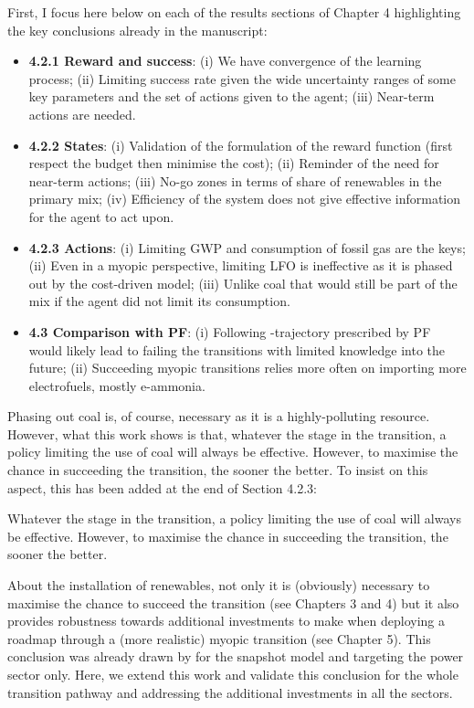 \documentclass[12pt,a4paper]{article}
\begin{document}
\noindent First, I focus here below on each of the results sections of Chapter 4 highlighting the key conclusions already in the manuscript:

\begin{itemize}
\item \textbf{4.2.1 Reward and success}: (i) We have convergence of the learning process; (ii) Limiting success rate given the wide uncertainty ranges of some key parameters and the set of actions given to the agent; (iii) Near-term actions are needed.
\item \textbf{4.2.2 States}: (i) Validation of the formulation of the reward function (first respect the  budget then minimise the cost); (ii) Reminder of the need for near-term actions; (iii) No-go zones in terms of share of renewables in the primary mix; (iv) Efficiency of the system does not give effective information for the agent to act upon.
\item \textbf{4.2.3 Actions}: (i) Limiting GWP and consumption of fossil gas are the keys; (ii) Even in a myopic perspective, limiting LFO is ineffective as it is phased out by the cost-driven model; (iii) Unlike coal that would still be part of the mix if the agent did not limit its consumption.
\item \textbf{4.3 Comparison with PF}: (i) Following -trajectory prescribed by PF would likely lead to failing the transitions with limited knowledge into the future; (ii) Succeeding myopic transitions relies more often on importing more electrofuels, mostly e-ammonia. 
\end{itemize}

Phasing out coal is, of course, necessary as it is a highly-polluting resource. However, what this work shows is that, whatever the stage in the transition, a policy limiting the use of coal will always be effective. However, to maximise the chance in succeeding the transition, the sooner the better. To insist on this aspect, this has been added {\color{blue}at the end of Section 4.2.3}:

\begin{mdframed}[style=manuscript] 
Whatever the stage in the transition, a policy limiting the use of coal will always be effective. However, to maximise the chance in succeeding the transition, the sooner the better.
\end{mdframed}

About the installation of renewables, not only it is (obviously) necessary to maximise the chance to succeed the transition (see Chapters 3 and 4) but it also provides robustness towards additional investments to make when deploying a roadmap through a (more realistic) myopic transition (see Chapter 5). This conclusion was already drawn by \citet{moret2020overcapacity} for the snapshot model and targeting the power sector only. Here, we extend this work and validate this conclusion for the whole transition pathway and addressing the additional investments in all the sectors.
\end{document}
